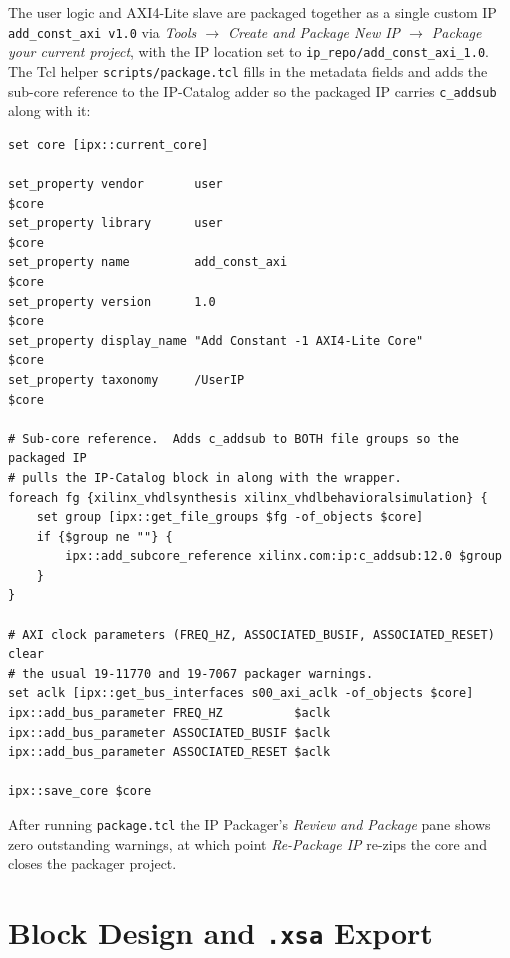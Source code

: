 \documentclass[11pt,letterpaper]{article}
\begin{document}
The user logic and AXI4-Lite slave are packaged together as a single
custom IP \texttt{add\_const\_axi v1.0} via
\textit{Tools $\rightarrow$ Create and Package New IP $\rightarrow$
Package your current project}, with the IP location set to
\texttt{ip\_repo/add\_const\_axi\_1.0}. The Tcl helper
\texttt{scripts/package.tcl} fills in the metadata fields and adds the
sub-core reference to the IP-Catalog adder so the packaged IP carries
\texttt{c\_addsub} along with it:

\begin{lstlisting}[style=tcl,caption={Excerpt of \texttt{package.tcl} --
                   identification, sub-core reference, clock parameters}]
set core [ipx::current_core]

set_property vendor       user                                          $core
set_property library      user                                          $core
set_property name         add_const_axi                                 $core
set_property version      1.0                                           $core
set_property display_name "Add Constant -1 AXI4-Lite Core"              $core
set_property taxonomy     /UserIP                                       $core

# Sub-core reference.  Adds c_addsub to BOTH file groups so the packaged IP
# pulls the IP-Catalog block in along with the wrapper.
foreach fg {xilinx_vhdlsynthesis xilinx_vhdlbehavioralsimulation} {
    set group [ipx::get_file_groups $fg -of_objects $core]
    if {$group ne ""} {
        ipx::add_subcore_reference xilinx.com:ip:c_addsub:12.0 $group
    }
}

# AXI clock parameters (FREQ_HZ, ASSOCIATED_BUSIF, ASSOCIATED_RESET) clear
# the usual 19-11770 and 19-7067 packager warnings.
set aclk [ipx::get_bus_interfaces s00_axi_aclk -of_objects $core]
ipx::add_bus_parameter FREQ_HZ          $aclk
ipx::add_bus_parameter ASSOCIATED_BUSIF $aclk
ipx::add_bus_parameter ASSOCIATED_RESET $aclk

ipx::save_core $core
\end{lstlisting}

After running \texttt{package.tcl} the IP Packager's
\textit{Review and Package} pane shows zero outstanding warnings, at
which point \textit{Re-Package IP} re-zips the core and closes the
packager project.

\section{Block Design and \texttt{.xsa} Export}
\end{document}
